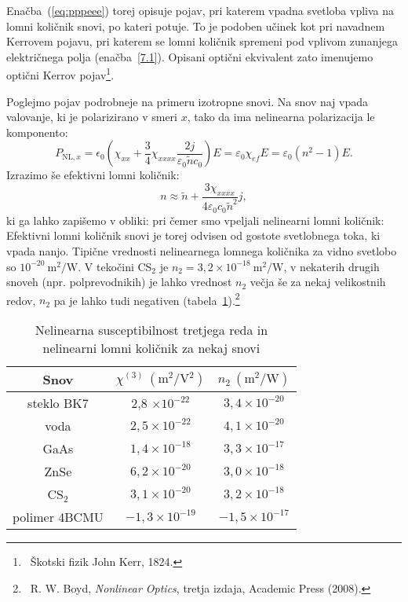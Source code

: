 Enačba~(\ref{eq:pppeee}) 
torej opisuje pojav, 
pri katerem vpadna svetloba vpliva na lomni količnik snovi, po kateri 
potuje.
To je podoben učinek kot pri navadnem Kerrovem pojavu, pri katerem se lomni količnik 
spremeni pod vplivom zunanjega električnega polja (enačba~\ref{7.1}).
Opisani optični ekvivalent zato imenujemo optični 
Kerrov pojav\footnote{~Škotski fizik John Kerr, 1824.}.

Poglejmo pojav podrobneje na primeru izotropne snovi. Na snov naj vpada valovanje, ki je polarizirano
v smeri $x$, tako da ima nelinearna polarizacija le komponento:
\begin{equation}
P_{\mathrm{NL},x}=
\epsilon_{0} \left(\chi_{xx} +\frac{3}{4} \chi_{xxxx}\frac{2 j }
{\varepsilon_0 \tilde{n} c_0}\right)E = \varepsilon_0 \chi_{ef}E = \varepsilon_0 (n^2-1) E.
\end{equation}
Izrazimo še efektivni lomni količnik:
\begin{equation}
n \approx \tilde{n} + \frac{3 \chi_{xxxx}}{4 \varepsilon_0 c_0 \tilde{n}^2} j,
\end{equation}
ki ga lahko zapišemo v obliki:
pri čemer smo vpeljali nelinearni lomni količnik:
Efektivni lomni količnik snovi je torej odvisen od gostote svetlobnega toka, ki vpada nanjo. 
Tipične vrednosti nelinearnega lomnega količnika za vidno svetlobo so $10^{-20}~\si{\metre^2/\watt}$.
V tekočini CS$_2$ je $n_2 = 3,2 \times 10^{-18}~\si{\metre^2/\watt}$, v nekaterih 
drugih snoveh (npr. polprevodnikih) je lahko vrednost $n_2$ večja še za nekaj 
velikostnih redov, $n_2$ pa je lahko tudi negativen (tabela~\ref{table:chi3}).\footnote{~R.
W. Boyd, {\it Nonlinear Optics}, tretja izdaja, Academic Press (2008).}

\begin{table}[ht]
 \centering
\begin{tabular}{|c|c|c|} \hline  
      Snov & $\chi^{(3)}~(\si{\metre^2/\volt^2})$ & $n_2~(\si{\metre^2/\watt})$\\ \hline
     steklo BK7 & 2,8 $\times 10^{-22}$ & $3,4 \times 10^{-20}$ \\ \hline
     voda & $2,5 \times 10^{-22}$ & $4,1 \times 10^{-20}$ \\ \hline
     GaAs & $1,4 \times 10^{-18}$ & $3,3 \times 10^{-17}$ \\ \hline\index{GaAs}
     ZnSe & $6,2 \times 10^{-20}$ & $3,0 \times 10^{-18}$ \\ \hline\index{ZnSe}
     CS$_2$ & $3,1 \times 10^{-20}$ & $3,2 \times 10^{-18}$ \\ \hline \index{CS$_2$}
     polimer 4BCMU  & $-1,3 \times 10^{-19}$ & $-1,5 \times 10^{-17}$ \\ \hline      
\end{tabular}
  \caption{Nelinearna susceptibilnost tretjega reda in nelinearni lomni količnik za nekaj snovi}
\label{table:chi3}
\end{table}

